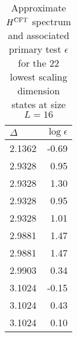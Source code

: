 \documentclass[10pt, a4paper]{article}
\begin{document}
{\begin{enumerate}
\begin{table}
\begin{minipage}{.5\linewidth}
\begin{tabular}{lr}
            \toprule
            $\Delta$ & $\log \epsilon$ \\
            \midrule
            2.1362 & -0.69 \\
            2.9328 & 0.95 \\
            2.9328 & 1.30 \\
            2.9328 & 0.95 \\
            2.9328 & 1.01 \\
            2.9881 & 1.47 \\
            2.9881 & 1.47 \\
            2.9903 & 0.34 \\
            3.1024 & -0.15 \\
            3.1024 & 0.43 \\
            3.1024 & 0.10 \\
            \bottomrule
            \end{tabular}
        \end{minipage} 

      \caption{Approximate $H^{\rm CFT}$ spectrum and associated primary test $\epsilon$ for the $22$ lowest scaling dimension states at size $L=16$ \label{spectrum_eps}}
  \end{table}
  

\end{enumerate}}
\end{document}
